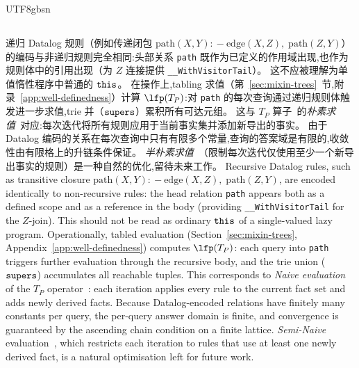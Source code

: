 \begin{CJK*}{UTF8}{gbsn}
\subsection{}
\label{sec:recursive-rules}

\ifPaperChinese
递归 Datalog 规则（例如传递闭包
$\mathrm{path}(X, Y) \mathrel{{:}\!{-}} \mathrm{edge}(X, Z),\; \mathrm{path}(Z, Y)$）的编码与非递归规则完全相同:头部关系 \texttt{path} 既作为已定义的作用域出现,也作为规则体中的引用出现（为 $Z$ 连接提供 \texttt{__WithVisitorTail}）。
这不应被理解为单值惰性程序中普通的 $\mathtt{this}$。
在操作上,tabling 求值（第~\ref{sec:mixin-trees}~节,附录~\ref{app:well-definedness}）计算 $\lfp(T_P)$:对 \texttt{path} 的每次查询通过递归规则体触发进一步求值,trie 并（$\mathtt{supers}$）累积所有可达元组。
这与 $T_P$ 算子~\cite{vanemden1976-predicate-logic-semantics}的\emph{朴素求值}~\cite{bancilhon1986-recursive-query-strategies}对应:每次迭代将所有规则应用于当前事实集并添加新导出的事实。
由于 Datalog 编码的关系在每次查询中只有有限多个常量,查询的答案域是有限的,收敛性由有限格上的升链条件保证。
\emph{半朴素求值}~\cite{bancilhon1986-recursive-query-strategies}（限制每次迭代仅使用至少一个新导出事实的规则）是一种自然的优化,留待未来工作。
\else
Recursive Datalog rules, such as transitive closure
$\mathrm{path}(X, Y) \mathrel{{:}\!{-}} \mathrm{edge}(X, Z),\; \mathrm{path}(Z, Y)$,
are encoded identically to non-recursive rules: the
head relation \texttt{path} appears both as a defined scope
and as a reference in the body (providing
\texttt{__WithVisitorTail} for the $Z$-join).
This should not be read as ordinary $\mathtt{this}$ of a
single-valued lazy program.
Operationally, tabled evaluation
(Section~\ref{sec:mixin-trees},
Appendix~\ref{app:well-definedness})
computes $\lfp(T_P)$: each query into
\texttt{path} triggers further evaluation through
the recursive body, and the trie union ($\mathtt{supers}$)
accumulates all reachable tuples.
This corresponds to \emph{Naive
evaluation}~\cite{bancilhon1986-recursive-query-strategies} of the
$T_P$
operator~\cite{vanemden1976-predicate-logic-semantics}:
each iteration applies every rule to the current
fact set and adds newly derived facts.
Because Datalog-encoded relations have finitely many
constants per query, the per-query answer domain is
finite, and convergence is guaranteed by the ascending
chain condition on a finite lattice.
\emph{Semi-Naive} evaluation~\cite{bancilhon1986-recursive-query-strategies},
which restricts each iteration to rules that use at
least one newly derived fact, is a natural
optimisation left for future work.
\fi


\end{CJK*}

